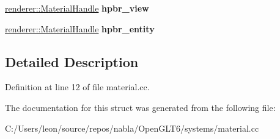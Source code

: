 \begin{DoxyCompactItemize}
\item 
\mbox{\label{structnabla_1_1_matrial_systerm_1_1_data_af08031a86641ee9f20bd13a6ccfcf2f1}} 
\mbox{\hyperlink{classnabla_1_1renderer_1_1_handle}{renderer\+::\+Material\+Handle}} {\bfseries hpbr\+\_\+view}
\item 
\mbox{\label{structnabla_1_1_matrial_systerm_1_1_data_a9777d5a8c4793fc00145c8dd5c2cbbee}} 
\mbox{\hyperlink{classnabla_1_1renderer_1_1_handle}{renderer\+::\+Material\+Handle}} {\bfseries hpbr\+\_\+entity}
\end{DoxyCompactItemize}


\subsection{Detailed Description}


Definition at line 12 of file material.\+cc.



The documentation for this struct was generated from the following file\+:\begin{DoxyCompactItemize}
\item 
C\+:/\+Users/leon/source/repos/nabla/\+Open\+G\+L\+T6/systems/material.\+cc\end{DoxyCompactItemize}
